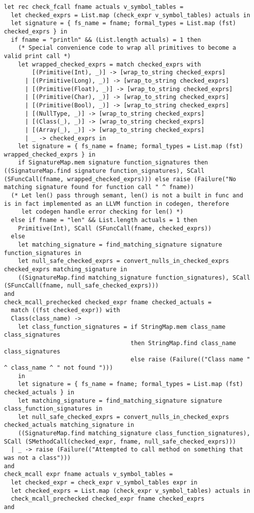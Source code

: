 \documentclass{article}
\begin{document}
\begin{verbatim}
let rec check_fcall fname actuals v_symbol_tables =
  let checked_exprs = List.map (check_expr v_symbol_tables) actuals in
  let signature = { fs_name = fname; formal_types = List.map (fst) checked_exprs } in
  if fname = "println" && (List.length actuals) = 1 then
    (* Special convenience code to wrap all primitives to become a valid print call *)
    let wrapped_checked_exprs = match checked_exprs with
        [(Primitive(Int), _)] -> [wrap_to_string checked_exprs]
      | [(Primitive(Long), _)] -> [wrap_to_string checked_exprs]
      | [(Primitive(Float), _)] -> [wrap_to_string checked_exprs]
      | [(Primitive(Char), _)] -> [wrap_to_string checked_exprs]
      | [(Primitive(Bool), _)] -> [wrap_to_string checked_exprs]
      | [(NullType, _)] -> [wrap_to_string checked_exprs]
      | [(Class(_), _)] -> [wrap_to_string checked_exprs]
      | [(Array(_), _)] -> [wrap_to_string checked_exprs]
      | _ -> checked_exprs in
    let signature = { fs_name = fname; formal_types = List.map (fst) wrapped_checked_exprs } in
    if SignatureMap.mem signature function_signatures then ((SignatureMap.find signature function_signatures), SCall (SFuncCall(fname, wrapped_checked_exprs))) else raise (Failure("No matching signature found for function call " ^ fname))
  (* Let len() pass through semant, len() is not a built in func and is in fact implemented as an LLVM function in codegen, therefore
     let codegen handle error checking for len() *)
  else if fname = "len" && List.length actuals = 1 then
    Primitive(Int), SCall (SFuncCall(fname, checked_exprs))
  else
    let matching_signature = find_matching_signature signature function_signatures in
    let null_safe_checked_exprs = convert_nulls_in_checked_exprs checked_exprs matching_signature in
    ((SignatureMap.find matching_signature function_signatures), SCall (SFuncCall(fname, null_safe_checked_exprs)))
and
check_mcall_prechecked checked_expr fname checked_actuals =
  match ((fst checked_expr)) with
  Class(class_name) ->
    let class_function_signatures = if StringMap.mem class_name class_signatures
                                    then StringMap.find class_name class_signatures
                                    else raise (Failure(("Class name " ^ class_name ^ " not found ")))
    in
    let signature = { fs_name = fname; formal_types = List.map (fst) checked_actuals } in
    let matching_signature = find_matching_signature signature class_function_signatures in
    let null_safe_checked_exprs = convert_nulls_in_checked_exprs checked_actuals matching_signature in
    ((SignatureMap.find matching_signature class_function_signatures), SCall (SMethodCall(checked_expr, fname, null_safe_checked_exprs)))
  | _ -> raise (Failure(("Attempted to call method on something that was not a class")))
and
check_mcall expr fname actuals v_symbol_tables =
  let checked_expr = check_expr v_symbol_tables expr in
  let checked_exprs = List.map (check_expr v_symbol_tables) actuals in
  check_mcall_prechecked checked_expr fname checked_exprs
and


\end{verbatim}
\end{document}
